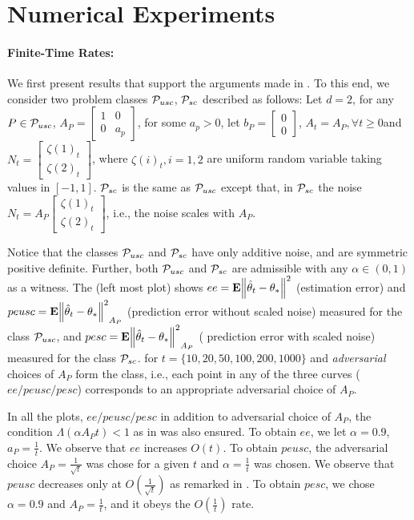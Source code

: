 \section{Numerical Experiments}\label{sec:exp}

\paragraph{Finite-Time Rates:} We first present results that support the arguments made in . To this end, we consider two problem classes $\P_{usc}$, $\P_{sc}$ described as follows: Let $d=2$, for any $P\in \P_{usc}$, $A_P=\left[\begin{matrix}1 &0\\ 0 & a_p\end{matrix}\right]$, for some $a_p>0$, let $b_P=\left[\begin{matrix}0\\0\end{matrix}\right]$, $A_t=A_P,\forall t\geq 0$and $N_t=\left[\begin{matrix}\zeta(1)_t\\ \zeta(2)_t\end{matrix}\right]$, where $\zeta(i)_t, i=1,2$ are \iid uniform random variable taking values in $[-1,1]$. $\P_{sc}$ is the same as $\P_{usc}$ except that, in $\P_{sc}$ the noise $N_t=A_P \left[\begin{matrix}\zeta(1)_t\\ \zeta(2)_t\end{matrix}\right]$, i.e., the noise scales with $A_P$.

Notice that the classes $\P_{usc}$ and $\P_{sc}$ have only additive noise, and are symmetric positive definite. Further,  both $\P_{usc}$ and $\P_{sc}$ are admissible with any $\alpha\in(0,1)$ as a witness. The  (left most plot) shows $ee=\E{\norm{\thh_t-\ts}^2}$ (estimation error) and $peusc=\E{\norm{\thh_t-\ts}^2}_{A_P}$ (prediction error without scaled noise) measured for the class $\P_{usc}$,  and $pesc=\E{\norm{\thh_t-\ts}^2}_{A_P}$ ( prediction error with scaled noise)  measured for the class $\P_{sc}$. for $t=\{10,20,50,100,200,1000\}$ and \emph{adversarial} choices of $A_P$ form the class, i.e., each point in any of the three curves ($ee/peusc/pesc$) corresponds to an appropriate adversarial choice of $A_P$. 

In all the plots, $ee/peusc/pesc$ in addition to adversarial choice of $A_P$, the condition $\Lambda(\alpha A_P t )<1$ as in  was also ensured. 
To obtain $ee$, we let $\alpha=0.9$, $a_P=\frac{1}{t}$. We observe that $ee$ increases $O(t)$. To obtain $peusc$, the adversarial choice $A_P=\frac{1}{\sqrt{t}}$ was chose for a given $t$ and $\alpha=\frac{1}{t}$ was chosen. We observe that $peusc$ decreases only at $O(\frac{1}{\sqrt{t}})$ as remarked in . To obtain $pesc$, we chose $\alpha=0.9$ and $A_P=\frac{1}{t}$, and it obeys the $O(\frac{1}{t})$ rate.

